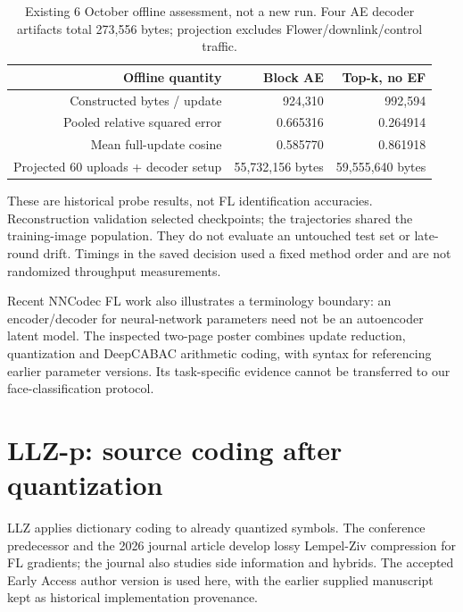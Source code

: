 \documentclass[11pt,a4paper]{article}
\begin{document}
\begin{table}[htbp]
\centering
\small
\begin{tabularx}{\textwidth}{R{1.44000}R{0.78000}R{0.78000}}
\toprule
\textbf{Offline quantity} & \textbf{Block AE} & \textbf{Top-k, no EF} \\\midrule
Constructed bytes / update & 924,310 & 992,594 \\
Pooled relative squared error & 0.665316 & 0.264914 \\
Mean full-update cosine & 0.585770 & 0.861918 \\
Projected 60 uploads + decoder setup & 55,732,156 bytes & 59,555,640 bytes \\
\bottomrule
\end{tabularx}
\caption{Existing 6 October offline assessment, not a new run. Four AE decoder artifacts total 273,556 bytes; projection excludes Flower/downlink/control traffic.}
\label{tab:ae}
\end{table}

These are historical probe results, not FL identification accuracies. Reconstruction validation selected checkpoints; the trajectories shared the training-image population. They do not evaluate an untouched test set or late-round drift. Timings in the saved decision used a fixed method order and are not randomized throughput measurements.

Recent NNCodec FL work also illustrates a terminology boundary: an encoder/decoder for neural-network parameters need not be an autoencoder latent model. The inspected two-page poster combines update reduction, quantization and DeepCABAC arithmetic coding, with syntax for referencing earlier parameter versions. Its task-specific evidence cannot be transferred to our face-classification protocol. \parencite{becking2025tinyfl}

\section{LLZ-p: source coding after quantization}

LLZ applies dictionary coding to already quantized symbols. The conference predecessor and the 2026 journal article develop lossy Lempel-Ziv compression for FL gradients; the journal also studies side information and hybrids. The accepted Early Access author version is used here, with the earlier supplied manuscript kept as historical implementation provenance. \parencite{zhong2023llz,cao2026llz}
\end{document}
